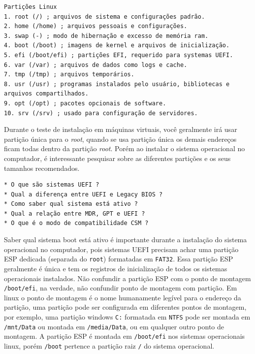 \documentclass[12pt,a4paper]{article}
\begin{document}
\begin{lstlisting} 
Partições Linux
1. root (/) ; arquivos de sistema e configurações padrão.
2. home (/home) ; arquivos pessoais e configurações.
3. swap (-) ; modo de hibernação e excesso de memória ram.
4. boot (/boot) ; imagens de kernel e arquivos de inicialização.
5. efi (/boot/efi) ; partições EFI, requerido para systemas UEFI.
6. var (/var) ; arquivos de dados como logs e cache.
7. tmp (/tmp) ; arquivos temporários.
8. usr (/usr) ; programas instalados pelo usuário, bibliotecas e arquivos compartilhados.
9. opt (/opt) ; pacotes opcionais de software.
10. srv (/srv) ; usado para configuração de servidores.
\end{lstlisting}

\vspace{\baselineskip}

Durante o teste de instalação em máquinas virtuais, você geralmente irá usar partição única para o \textit{root}, quando se usa partição única os demais endereços ficam todas dentro da partição \textit{root}. Porém ao instalar o sistema operacional no computador, é interessante pesquisar sobre as diferentes partições e os seus tamanhos recomendados.\\

\begin{lstlisting}
* O que são sistemas UEFI ?
* Qual a diferença entre UEFI e Legacy BIOS ?
* Como saber qual sistema está ativo ? 
* Qual a relação entre MDR, GPT e UEFI ? 
* O que é o modo de compatibilidade CSM ?
\end{lstlisting}

\vspace{\baselineskip}

Saber qual sistema boot está ativo é importante durante a instalação do sistema operacional no computador, pois sistemas UEFI precisam achar uma partição ESP dedicada (separada do \texttt{root}) formatadas em \texttt{FAT32}. Essa partição ESP geralmente é única e tem os registros de inicialização de todos os sistemas operacionais instalados. Não confundir a partição ESP com o ponto de montagem \texttt{/boot/efi}, na verdade, não confundir ponto de montagem com partição. Em linux o ponto de montagem é o nome humanamente legível para o endereço da partição, uma partição pode ser configurada em diferentes pontos de montagem, por exemplo, uma partição windows \texttt{C:} formatada em \texttt{NTFS} pode ser montada em \texttt{/mnt/Data} ou montada em \texttt{/media/Data}, ou em qualquer outro ponto de montagem. A partição ESP é montada em \texttt{/boot/efi} nos sistemas operacionais linux, porém \texttt{/boot} pertence a partição raiz \texttt{/} do sistema operacional. \\
\end{document}
